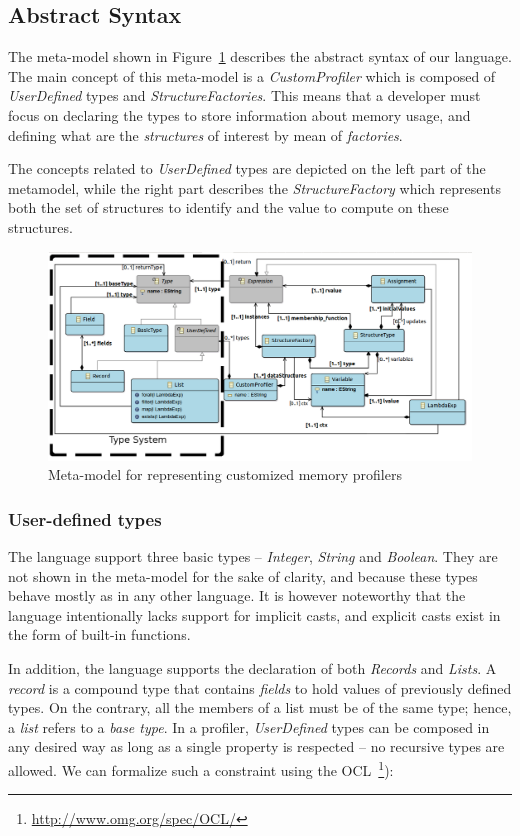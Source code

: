 \subsection{Abstract Syntax}\label{sec:abstract-syntax}

The meta-model shown in Figure~\ref{fig:as} describes the abstract syntax of our language.
The main concept of this meta-model is a \textit{CustomProfiler} which is composed of \textit{UserDefined} types and \textit{StructureFactories}.
This means that a developer must focus on declaring the types to store information about memory usage, and defining what are the \textit{structures} of interest by mean of \textit{factories}.

The concepts related to \textit{UserDefined} types are depicted on the left part of the metamodel, while the right part describes the \textit{StructureFactory} which represents both the set of  structures to identify and the value to compute on these structures.

\begin{figure}
\centering
\includegraphics[width=0.93\linewidth]{chapter6/fig/AS}
\caption{Meta-model for representing customized memory profilers}
\label{fig:as}
\end{figure}

\subsubsection*{User-defined types}
The language support three basic types -- \textit{Integer}, \textit{String} and \textit{Boolean}.
They are not shown in the meta-model for the sake of clarity, and because these types behave mostly as in any other language.
It is however noteworthy that the language intentionally lacks support for implicit casts, and explicit casts exist in the form of built-in functions. 

In addition, the language supports the declaration of both \textit{Records} and \textit{Lists}.
A \textit{record} is a compound type that contains \textit{fields} to hold values of previously defined types.
On the contrary,  all the members of a list must be of the same type; hence, a \textit{list} refers to a \textit{base type}.
In a profiler, \textit{UserDefined} types can be composed in any desired way as long as a single property is respected -- no recursive types are allowed.
We can formalize such a constraint using the \gls{OCL}~\footnote{\url{http://www.omg.org/spec/OCL/}}):

